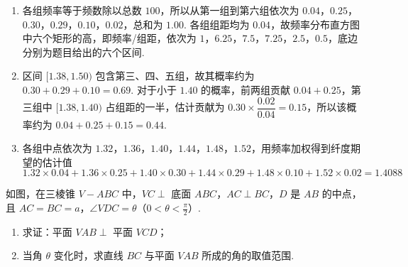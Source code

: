 \begin{solution}
\begin{enumerate}
\item 各组频率等于频数除以总数 \(100\)，所以从第一组到第六组依次为 \(0.04\)，\(0.25\)，\(0.30\)，\(0.29\)，\(0.10\)，\(0.02\)，总和为 \(1.00\). 各组组距均为 \(0.04\)，故频率分布直方图中六个矩形的高，即频率/组距，依次为 \(1\)，\(6.25\)，\(7.5\)，\(7.25\)，\(2.5\)，\(0.5\)，底边分别为题目给出的六个区间.
\item 区间 \([1.38,1.50)\) 包含第三、四、五组，故其概率约为 \(0.30+0.29+0.10=0.69\). 对于小于 \(1.40\) 的概率，前两组贡献 \(0.04+0.25\)，第三组中 \([1.38,1.40)\) 占组距的一半，估计贡献为 \(0.30\times\dfrac{0.02}{0.04}=0.15\)，所以该概率约为 \(0.04+0.25+0.15=0.44\).
\item 各组中点依次为 \(1.32\)，\(1.36\)，\(1.40\)，\(1.44\)，\(1.48\)，\(1.52\)，用频率加权得到纤度期望的估计值
\[
1.32\times0.04+1.36\times0.25+1.40\times0.30+1.44\times0.29+1.48\times0.10+1.52\times0.02=1.4088
\]
\end{enumerate}
\end{solution}

\begin{problem}
如图，在三棱锥 \(V - ABC\) 中，\(VC \perp\) 底面 \(ABC\)，\(AC \perp BC\)，\(D\) 是 \(AB\) 的中点，且 \(AC = BC = a\)，\(\angle VDC = \theta\)（\(0 < \theta < \frac{\pi}{2}\)）.

\begin{enumerate}
\item 求证：平面 \(VAB \perp\) 平面 \(VCD\)；
\item 当角 \(\theta\) 变化时，求直线 \(BC\) 与平面 \(VAB\) 所成的角的取值范围.
\end{enumerate}

\end{problem}

